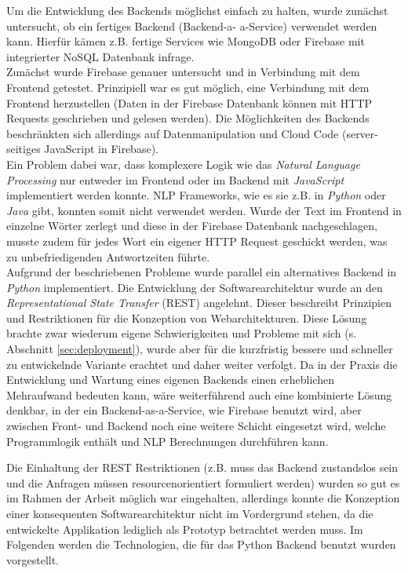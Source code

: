Um die Entwicklung des Backends möglichst einfach zu halten, wurde zunächst untersucht, ob ein fertiges Backend (Backend-a- a-Service) verwendet werden kann. Hierfür kämen z.B. fertige Services wie MongoDB oder Firebase mit integrierter NoSQL Datenbank infrage\cite{almootassem2017}.\\
Zunächst wurde Firebase genauer untersucht und in Verbindung mit dem Frontend getestet. Prinzipiell war es gut möglich, eine Verbindung mit dem Frontend herzustellen (Daten in der Firebase Datenbank können mit HTTP Requests geschrieben und gelesen werden). Die Möglichkeiten des Backends beschränkten sich allerdings auf Datenmanipulation und Cloud Code (server-seitiges JavaScript in Firebase).\\
Ein Problem dabei war, dass komplexere Logik wie das \textit{Natural Language Processing} nur entweder im Frontend oder im Backend mit \textit{JavaScript} implementiert werden konnte. NLP Frameworks, wie es sie z.B. in \textit{Python} oder \textit{Java} gibt, konnten somit nicht verwendet werden. Wurde der Text im Frontend in einzelne Wörter zerlegt und diese in der Firebase Datenbank nachgeschlagen, musste zudem für jedes Wort ein eigener HTTP Request geschickt werden, was zu unbefriedigenden Antwortzeiten führte.\\

Aufgrund der beschriebenen Probleme wurde parallel ein alternatives Backend in \textit{Python} implementiert. Die Entwicklung der Softwarearchitektur wurde an den \textit{Representational State Transfer} (REST) angelehnt. Dieser beschreibt Prinzipien und Restriktionen für die Konzeption von Webarchitekturen\cite{Fielding:2000:ASD:932295}. Diese Lösung brachte zwar wiederum eigene Schwierigkeiten und Probleme mit sich (s. Abschnitt \ref{sec:deployment}), wurde aber für die kurzfristig bessere und schneller zu entwickelnde Variante erachtet und daher weiter verfolgt. Da in der Praxis die Entwicklung und Wartung eines eigenen Backends einen erheblichen Mehraufwand bedeuten kann, wäre weiterführend auch eine kombinierte Lösung denkbar, in der ein Backend-as-a-Service, wie Firebase benutzt wird, aber zwischen Front- und Backend noch eine weitere Schicht eingesetzt wird, welche Programmlogik enthält und NLP Berechnungen durchführen kann.

Die Einhaltung der REST Restriktionen (z.B. muss das Backend zustandslos sein und die Anfragen müssen resourcenorientiert formuliert werden) wurden so gut es im Rahmen der Arbeit möglich war eingehalten, allerdings konnte die Konzeption einer konsequenten Softwarearchitektur nicht im Vordergrund stehen, da die entwickelte Applikation lediglich als Prototyp betrachtet werden muss. Im Folgenden werden die Technologien, die für das Python Backend benutzt wurden vorgestellt.

